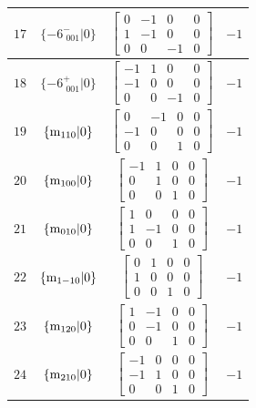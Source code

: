 \documentclass[fleqn,8pt]{jsarticle}
\begin{document}
\begin{longtable}{cccc}
$ 17 $ & $ \{-6^{-}_{\,\,001}|0\} $ & $ \begin{bmatrix} 0 & -1 & 0 & 0 \\ 1 & -1 & 0 & 0 \\ 0 & 0 & -1 & 0 \end{bmatrix} $ & $ -1 $ \\ \hline
$ 18 $ & $ \{-6^{+}_{\,\,001}|0\} $ & $ \begin{bmatrix} -1 & 1 & 0 & 0 \\ -1 & 0 & 0 & 0 \\ 0 & 0 & -1 & 0 \end{bmatrix} $ & $ -1 $ \\ \hline
$ 19 $ & $ \{{\rm m}_{110}|0\} $ & $ \begin{bmatrix} 0 & -1 & 0 & 0 \\ -1 & 0 & 0 & 0 \\ 0 & 0 & 1 & 0 \end{bmatrix} $ & $ -1 $ \\ \hline
$ 20 $ & $ \{{\rm m}_{100}|0\} $ & $ \begin{bmatrix} -1 & 1 & 0 & 0 \\ 0 & 1 & 0 & 0 \\ 0 & 0 & 1 & 0 \end{bmatrix} $ & $ -1 $ \\ \hline
$ 21 $ & $ \{{\rm m}_{010}|0\} $ & $ \begin{bmatrix} 1 & 0 & 0 & 0 \\ 1 & -1 & 0 & 0 \\ 0 & 0 & 1 & 0 \end{bmatrix} $ & $ -1 $ \\ \hline
$ 22 $ & $ \{{\rm m}_{1-10}|0\} $ & $ \begin{bmatrix} 0 & 1 & 0 & 0 \\ 1 & 0 & 0 & 0 \\ 0 & 0 & 1 & 0 \end{bmatrix} $ & $ -1 $ \\ \hline
$ 23 $ & $ \{{\rm m}_{120}|0\} $ & $ \begin{bmatrix} 1 & -1 & 0 & 0 \\ 0 & -1 & 0 & 0 \\ 0 & 0 & 1 & 0 \end{bmatrix} $ & $ -1 $ \\ \hline
$ 24 $ & $ \{{\rm m}_{210}|0\} $ & $ \begin{bmatrix} -1 & 0 & 0 & 0 \\ -1 & 1 & 0 & 0 \\ 0 & 0 & 1 & 0 \end{bmatrix} $ & $ -1 $ \\
\end{longtable}
\end{document}
